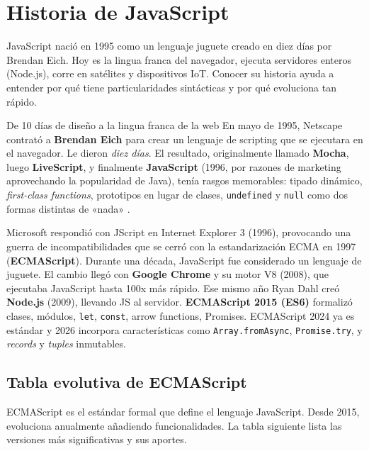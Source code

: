 \documentclass[11pt,a4paper,openany]{book}
\begin{document}
\section{Historia de JavaScript}

JavaScript nació en 1995 como un lenguaje juguete creado en
diez días por Brendan Eich. Hoy es la lingua franca del navegador,
ejecuta servidores enteros (Node.js), corre en satélites y dispositivos
IoT. Conocer su historia ayuda a entender por qué tiene
particularidades sintácticas y por qué evoluciona tan rápido.


\begin{cajahistoria}{De 10 días de diseño a la lingua franca de la web}
En mayo de 1995, Netscape contrató a \textbf{Brendan Eich} para
crear un lenguaje de scripting que se ejecutara en el navegador.
Le dieron \emph{diez días}. El resultado, originalmente llamado
\textbf{Mocha}, luego \textbf{LiveScript}, y finalmente
\textbf{JavaScript} (1996, por razones de marketing aprovechando la
popularidad de Java), tenía rasgos memorables: tipado dinámico,
\emph{first-class functions}, prototipos en lugar de clases,
\texttt{undefined} y \texttt{null} como dos formas distintas de
«nada» \cite{crockford2008javascript}.

Microsoft respondió con JScript en Internet Explorer 3 (1996),
provocando una guerra de incompatibilidades que se cerró con la
estandarización ECMA en 1997 (\textbf{ECMAScript}). Durante una
década, JavaScript fue considerado un lenguaje de juguete. El cambio
llegó con \textbf{Google Chrome} y su motor V8 (2008), que ejecutaba
JavaScript hasta 100x más rápido. Ese mismo año Ryan Dahl creó
\textbf{Node.js} (2009), llevando JS al servidor. \textbf{ECMAScript
2015 (ES6)} formalizó clases, módulos, \texttt{let}, \texttt{const},
arrow functions, Promises. ECMAScript 2024 ya es estándar y 2026
\cite{ecma2024} incorpora características como \texttt{Array.fromAsync},
\texttt{Promise.try}, y \emph{records} y \emph{tuples} inmutables.
\end{cajahistoria}

\subsection{Tabla evolutiva de ECMAScript}

ECMAScript es el estándar formal que define el lenguaje
JavaScript. Desde 2015, evoluciona anualmente añadiendo
funcionalidades. La tabla siguiente lista las versiones más
significativas y sus aportes.
\end{document}
